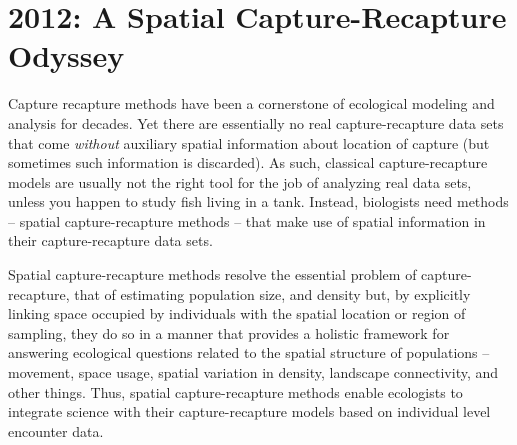 


\chapter{
 2012: A Spatial Capture-Recapture Odyssey
 }

\label{chapt.final}

\vspace{0.3cm}


\vspace{2in}

Capture recapture methods have been a cornerstone of ecological
modeling and analysis for decades.  Yet there are essentially no real
capture-recapture data sets that come {\it without} auxiliary spatial
information about location of capture (but sometimes such information
is discarded).  As such, classical capture-recapture
models are usually not the right tool for the job of analyzing real
data sets, unless you happen to study fish living in a tank.
Instead, biologists need methods -- spatial
capture-recapture methods -- that make use of spatial
information in their capture-recapture data sets.

Spatial capture-recapture methods resolve the essential problem of
capture-recapture, that of estimating population size,
and density 
but, by
explicitly linking space occupied by individuals with the spatial
location or region of sampling, they do so in a manner that provides a
holistic framework for answering ecological questions related to the
spatial structure of populations -- movement, space usage, spatial
variation in density, landscape connectivity, and other things.
 Thus, spatial capture-recapture methods enable ecologists
to integrate science with their capture-recapture models based on
individual level encounter data.

